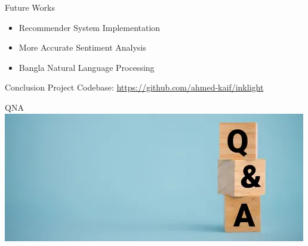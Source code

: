 \documentclass{beamer}
\begin{document}
	\begin{frame}{Future Works}
		\begin{itemize}
			\item Recommender System Implementation
			\vspace{0.5cm}
			\item More Accurate Sentiment Analysis
			\vspace{0.5cm}
			\item Bangla Natural Language Processing
		\end{itemize}
	\end{frame}
	
	
	\begin{frame}{Conclusion}
		Project Codebase:
		\url{https://github.com/ahmed-kaif/inklight}
	\end{frame}
	
\begin{frame}{QNA}
\includegraphics[width=\textwidth]{qna.png}
\end{frame}
	
\end{document}
